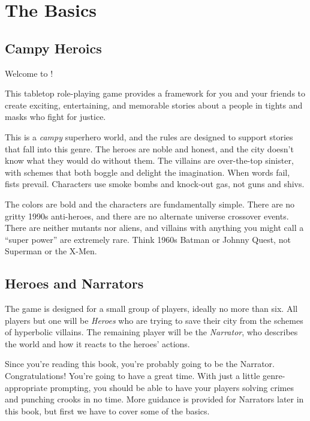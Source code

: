 \documentclass[letterpaper]{report}
\begin{document}
\tableofcontents{}

\chapter{The Basics}

\section{Campy Heroics}

Welcome to \kapow{}!

This tabletop role-playing game provides a framework for you
and your friends to create exciting, entertaining, and memorable
stories about a people in tights and masks who fight for justice.

This is a \textit{campy} superhero world, and the rules are designed
to support stories that fall into this genre. The heroes are noble and
honest, and the city doesn't know what they would do without them.
The villains are over-the-top sinister, with schemes that both boggle
and delight the imagination.
When words fail, fists prevail.
Characters use smoke bombs and knock-out gas, not guns and shivs.

The colors are bold and the characters are fundamentally simple.
There are no gritty 1990s anti-heroes, and there are no alternate
universe crossover events.
There are neither mutants nor aliens, and villains with anything you might
call a ``super power'' are extremely rare.
Think 1960s Batman or Johnny Quest, not Superman or the X-Men.

\section{Heroes and Narrators}

The game is designed for a small group of players, ideally no more than six.
All players but one will be \textit{Heroes} who are trying to save
their city from the schemes of hyperbolic villains.
The remaining player will be the \textit{Narrator}, who describes the world
and how it reacts to the heroes' actions.

Since you're reading this book, you're probably going to be the
Narrator. Congratulations! You're going to have a great time. With
just a little genre-appropriate prompting, you should be able to have
your players solving crimes and punching crooks in no time.
More guidance is provided for Narrators later in this book, but first
we have to cover some of the basics.
\end{document}
